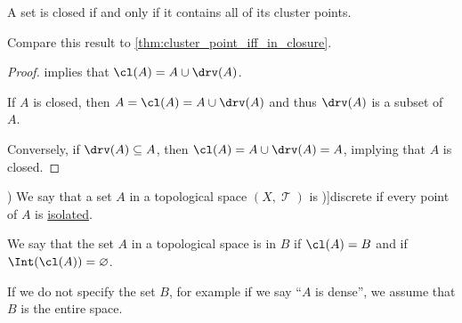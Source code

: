\begin{corollary}\label{thm:cluster_point_characterization}
  A set is closed if and only if it contains all of its cluster points.
\end{corollary}
\begin{comments}
  \item Compare this result to \cref{thm:cluster_point_iff_in_closure}.
\end{comments}
\begin{proof}
   implies that \( \cl(A) = A \cup \drv(A) \).

  If \( A \) is closed, then \( A = \cl(A) = A \cup \drv(A) \) and thus \( \drv(A) \) is a subset of \( A \).

  Conversely, if \( \drv(A) \subseteq A \), then \( \cl(A) = A \cup \drv(A) = A \), implying that \( A \) is closed.
\end{proof}

\begin{definition}\label{def:discrete_set})
  We say that a set \( A \) in a topological space \( (X, \mscrT) \) is \term[ru=дискретное (семейство), en=discrete (set) (\cite[exerc. 4G]{Willard2004GeneralTopology})]{discrete} if every point of \( A \) is \hyperref[def:set_cluster_point]{isolated}.
\end{definition}

\begin{definition}\label{def:topologically_dense_set}
  We say that the set \( A \) in a topological space is  in \( B \) if \( \cl(A) = B \) and  if \( \Int(\cl(A)) = \varnothing \).

  If we do not specify the set \( B \), for example if we say \enquote{\( A \) is dense}, we assume that \( B \) is the entire space.
\end{definition}

